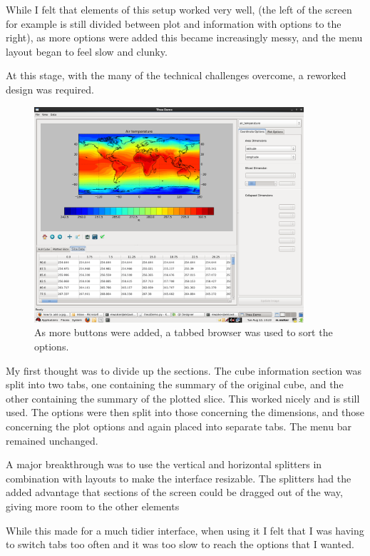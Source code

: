 \documentclass[whitecover]{MO_report}
\begin{document}
While I felt that elements of this setup worked very well, (the left of the
screen for example is still divided between plot and information with options
to the right), as more options were added this became increasingly messy, and
the menu layout began to feel slow and clunky.

At this stage, with the many of the technical challenges overcome, a
reworked design was required.

\begin{figure}[ht!]
\centering
\includegraphics[width=100mm]{resources/version2.png}
\caption{As more buttons were added, a tabbed browser was used to sort the
options.}
\label{overflow}
\end{figure}

\vspace{4mm}

My first thought was to divide up the sections. The cube information section
was split into two tabs, one containing the summary of the original cube,
and the other containing the summary of the plotted slice. This worked nicely
and is still used. The options were then split into those concerning the
dimensions, and those concerning the plot options and again placed into
separate tabs. The menu bar remained unchanged.

A major breakthrough was to use the vertical and horizontal splitters in
combination with layouts to make the interface resizable. The splitters
had the added advantage that sections of the screen could be dragged out of
the way, giving more room to the other elements

While this made for a much tidier interface, when using it I felt that I was
having to switch tabs too often and it was too slow to reach the options that
I wanted.
\end{document}
